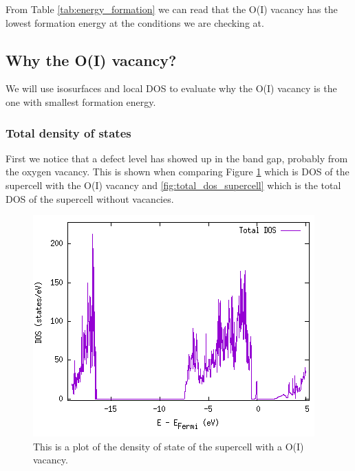 From Table \ref{tab:energy_formation} we can read that the O(I) vacancy has the lowest formation energy at the conditions we are checking at.

\subsection{Why the O(I) vacancy?}

We will use isosurfaces and local DOS to evaluate why the O(I) vacancy is the one with smallest formation energy.

\subsubsection{Total density of states}

First we notice that a defect level has showed up in the band gap, probably from the oxygen vacancy. This is shown when comparing Figure \ref{fig:total_dos_vac} which is DOS of the supercell with the O(I) vacancy and \ref{fig:total_dos_supercell} which is the total DOS of the supercell without vacancies.

\begin{figure}[H]
\includegraphics[width=\linewidth]{../fig/dosplot/total_dos_O_I_vacancy}\caption{This is a plot of the density of state of the supercell with a O(I) vacancy.}\label{fig:total_dos_vac}
\end{figure}

